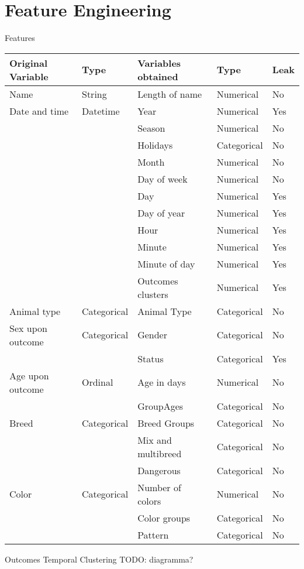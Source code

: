 \section{Feature Engineering}

\begin{frame}[t]{Features}	
	\begin{table}[t]
	\centering
	\begin{tabular}{@{}lllll@{}}
	\toprule
	Original Variable & Type        & Variables obtained & Type        & Leak \\ \midrule
	Name             & String      & Length of name     & Numerical   & No   \\
	Date and time    & Datetime    & Year               & Numerical   & Yes  \\
					 &             & Season             & Numerical   & No   \\
					 &			   & Holidays			& Categorical & No \\
					 &             & Month              & Numerical   & No   \\
					 &             & Day of week        & Numerical   & No   \\
					 &             & Day                & Numerical   & Yes  \\
					 &             & Day of year        & Numerical   & Yes  \\
					 &             & Hour               & Numerical   & Yes  \\
					 &             & Minute             & Numerical   & Yes  \\
					 &             & Minute of day      & Numerical   & Yes  \\
					 &             & Outcomes clusters  & Numerical   & Yes  \\
	Animal type      & Categorical & Animal Type        & Categorical & No   \\
	Sex upon outcome & Categorical & Gender             & Categorical & No   \\
					 &             & Status             & Categorical & Yes  \\
	Age upon outcome & Ordinal     & Age in days        & Numerical   & No   \\
			&	   & GroupAges		& Categorical & No\\
	Breed            & Categorical & Breed Groups       & Categorical & No   \\
					 &             & Mix and multibreed & Categorical & No   \\
					 &             & Dangerous          & Categorical & No   \\
	Color            & Categorical & Number of colors   & Numerical   & No   \\
					 &             & Color groups       & Categorical & No   \\
					 &             & Pattern            & Categorical & No   \\ \bottomrule
	\end{tabular}
	\end{table}
\end{frame}

\begin{frame}[t]{Outcomes Temporal Clustering}
	TODO: diagramma?
\end{frame}


